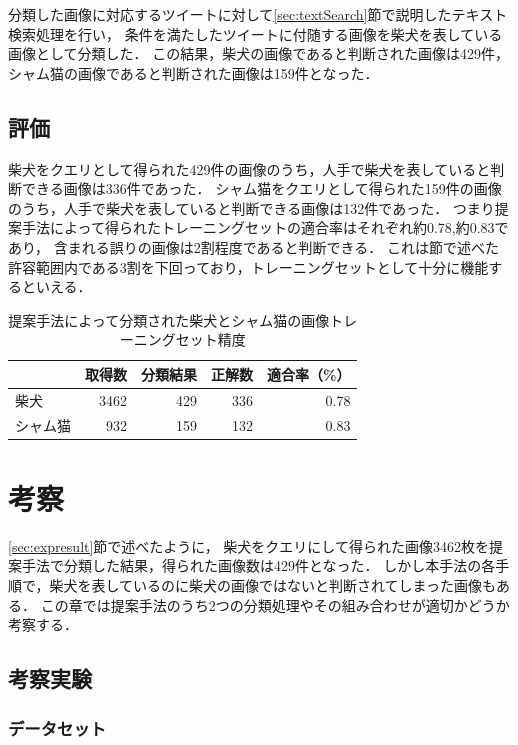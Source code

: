 分類した画像に対応するツイートに対して\ref{sec:textSearch}節で説明したテキスト検索処理を行い，
条件を満たしたツイートに付随する画像を柴犬を表している画像として分類した．
この結果，柴犬の画像であると判断された画像は429件，シャム猫の画像であると判断された画像は159件となった．

\section{評価}

柴犬をクエリとして得られた429件の画像のうち，人手で柴犬を表していると判断できる画像は336件であった．
シャム猫をクエリとして得られた159件の画像のうち，人手で柴犬を表していると判断できる画像は132件であった．
つまり提案手法によって得られたトレーニングセットの適合率はそれぞれ約0.78,約0.83であり，
含まれる誤りの画像は2割程度であると判断できる．
これは\label{sec:related}節で述べた許容範囲内である3割を下回っており，トレーニングセットとして十分に機能するといえる．


\begin{table}[tb]
\begin{center}
\caption{提案手法によって分類された柴犬とシャム猫の画像トレーニングセット精度}
\label{tab:result-shiba}
\begin{tabular}{|l|r|r|r|r|}\hline
& 取得数& 分類結果& 正解数& 適合率（\%） \\ \hline \hline

柴犬& 3462& 429& 336& 0.78 \\ \hline
シャム猫& 932& 159& 132& 0.83 \\ \hline
\end{tabular}
\end{center}
\end{table}

\chapter{考察}
\label{sec:examination}

\ref{sec:expresult}節で述べたように，
柴犬をクエリにして得られた画像3462枚を提案手法で分類した結果，得られた画像数は429件となった．
しかし本手法の各手順で，柴犬を表しているのに柴犬の画像ではないと判断されてしまった画像もある．
この章では提案手法のうち2つの分類処理やその組み合わせが適切かどうか考察する．

\section{考察実験}
\subsection{データセット}


